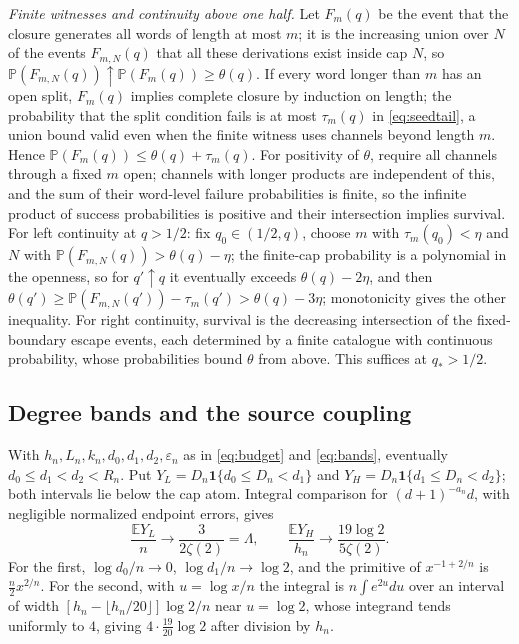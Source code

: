 \documentclass[11pt,letterpaper]{article}
\theoremstyle{plain}
\theoremstyle{definition}
\theoremstyle{remark}
\numberwithin{equation}{section}
\newcommand{\PP}{\mathbb P}
\newcommand{\EE}{\mathbb E}
\newcommand{\eps}{\varepsilon}
\newcommand{\ind}{\mathbf 1}
\begin{document}
\emph{Finite witnesses and continuity above one half.} Let $F_m(q)$ be the event that the closure generates all words of length at most $m$; it is the increasing union over $N$ of the events $F_{m,N}(q)$ that all these derivations exist inside cap $N$, so $\PP(F_{m,N}(q))\uparrow\PP(F_m(q))\ge\theta(q)$. If every word longer than $m$ has an open split, $F_m(q)$ implies complete closure by induction on length; the probability that the split condition fails is at most $\tau_m(q)$ in \eqref{eq:seedtail}, a union bound valid even when the finite witness uses channels beyond length $m$. Hence $\PP(F_m(q))\le\theta(q)+\tau_m(q)$. For positivity of $\theta$, require all channels through a fixed $m$ open; channels with longer products are independent of this, and the sum of their word-level failure probabilities is finite, so the infinite product of success probabilities is positive and their intersection implies survival. For left continuity at $q>1/2$: fix $q_0\in(1/2,q)$, choose $m$ with $\tau_m(q_0)<\eta$ and $N$ with $\PP(F_{m,N}(q))>\theta(q)-\eta$; the finite-cap probability is a polynomial in the openness, so for $q'\uparrow q$ it eventually exceeds $\theta(q)-2\eta$, and then $\theta(q')\ge\PP(F_{m,N}(q'))-\tau_m(q')>\theta(q)-3\eta$; monotonicity gives the other inequality. For right continuity, survival is the decreasing intersection of the fixed-boundary escape events, each determined by a finite catalogue with continuous probability, whose probabilities bound $\theta$ from above. This suffices at $q_*>1/2$.

\subsection{Degree bands and the source coupling}\label{app:degree}
With $h_n,L_n,k_n,d_0,d_1,d_2,\eps_n$ as in \eqref{eq:budget} and \eqref{eq:bands}, eventually $d_0\le d_1<d_2<R_n$. Put $Y_L=D_n\ind\{d_0\le D_n<d_1\}$ and $Y_H=D_n\ind\{d_1\le D_n<d_2\}$; both intervals lie below the cap atom. Integral comparison for $(d+1)^{-a_n}d$, with negligible normalized endpoint errors, gives
\begin{equation}\label{eq:bandmeans}
 \frac{\EE Y_L}n\longrightarrow\frac3{2\zeta(2)}=\Lambda,\qquad \frac{\EE Y_H}{h_n}\longrightarrow\frac{19\log2}{5\zeta(2)} .
\end{equation}
For the first, $\log d_0/n\to0$, $\log d_1/n\to\log2$, and the primitive of $x^{-1+2/n}$ is $\frac n2x^{2/n}$. For the second, with $u=\log x/n$ the integral is $n\int e^{2u}du$ over an interval of width $[h_n-\lfloor h_n/20\rfloor]\log2/n$ near $u=\log2$, whose integrand tends uniformly to $4$, giving $4\cdot\frac{19}{20}\log2$ after division by $h_n$.
\end{document}
